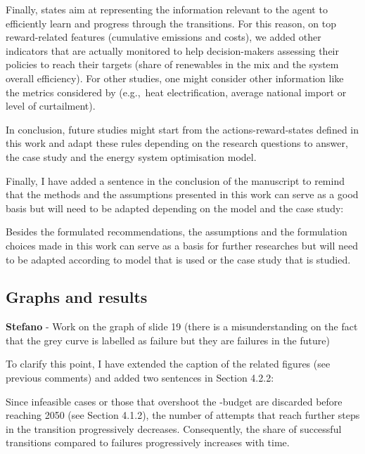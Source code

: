 \documentclass[12pt,a4paper]{article}
\def\eg{e.g.,\ }
\begin{document}
\begin{mdframed}[style=manuscript]
Finally, states aim at representing the information relevant to the agent to efficiently learn and progress through the transitions. For this reason, on top reward-related features (cumulative emissions and costs), we added other indicators that are actually monitored to help decision-makers assessing their policies to reach their targets (share of renewables in the mix and the system overall efficiency). For other studies, one might consider other information like the metrics considered by \citet{pickering2022diversity} (\eg heat electrification, average national import or level of curtailment).

In conclusion, future studies might start from the actions-reward-states defined in this work and adapt these rules depending on the research questions to answer, the case study and the energy system optimisation model.
\end{mdframed}

Finally, I have added a sentence {\color{blue}in the conclusion of the manuscript} to remind that the methods and the assumptions presented in this work can serve as a good basis but will need to be adapted depending on the model and the case study:

\begin{mdframed}[style=manuscript] %
Besides the formulated recommendations, the assumptions and the formulation choices made in this work can serve as a basis for further researches but will need to be adapted according to model that is used or the case study that is studied.
\end{mdframed}

\subsection{Graphs and results}
\label{general_graphs_results}

\begin{mdframed}[style=comment] %
{\color{orange} \textbf{Stefano}} - Work on the graph of slide 19 (there is a misunderstanding on the fact that the grey curve is labelled as failure but they are failures in the future)
\end{mdframed}

\noindent To clarify this point, I have extended the caption of the related figures (see previous comments) and added two sentences in {\color{blue} Section 4.2.2}:

\begin{mdframed}[style=manuscript] %
Since infeasible cases or those that overshoot the -budget are discarded before reaching 2050 (see Section 4.1.2), the number of attempts that reach further steps in the transition progressively decreases. Consequently, the share of successful transitions compared to failures progressively increases with time. 
\end{mdframed}
\end{document}

